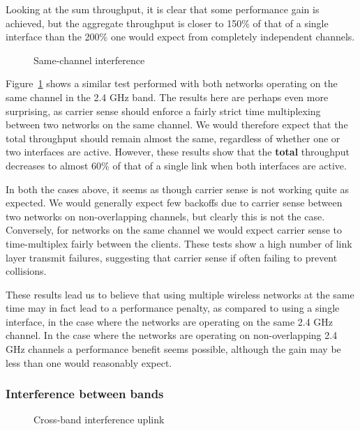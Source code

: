 Looking at the sum throughput, it is clear that some performance gain is
achieved, but the aggregate throughput is closer to 150\% of that of a single
interface than the 200\% one would expect from completely independent channels.

\begin{figure}[h]
 \centering
 
 \caption{Same-channel interference}\label{graph:sc-interference}
\end{figure}

Figure~\ref{graph:sc-interference} shows a similar test performed with both
networks operating on the same channel in the 2.4 GHz band. The results here are
perhaps even more surprising, as carrier sense should enforce a fairly strict
time multiplexing between two networks on the same channel. We would therefore
expect that the total throughput should remain almost the same, regardless of
whether one or two interfaces are active. However, these results show that the
\textbf{total} throughput decreases to almost 60\% of that of a single link when
both interfaces are active.

In both the cases above, it seems as though carrier sense is not working quite
as expected. We would generally expect few backoffs due to carrier sense between
two networks on non-overlapping channels, but clearly this is not the case.
Conversely, for networks on the same channel we would expect carrier sense to
time-multiplex fairly between the clients. These tests show a high number of 
link layer transmit failures, suggesting that carrier sense if often failing 
to prevent collisions.

These results lead us to believe that using multiple wireless networks at the
same time may in fact lead to a performance penalty, as compared to using a
single interface, in the case where the networks are operating on the same 2.4
GHz channel. In the case where the networks are operating on non-overlapping 2.4
GHz channels a performance benefit seems possible, although the gain may be less
than one would reasonably expect.


\subsubsection{Interference between bands}

\begin{figure}[h]
 \centering
 
 \caption{Cross-band interference uplink}\label{graph:cb-interference-up}
\end{figure}

